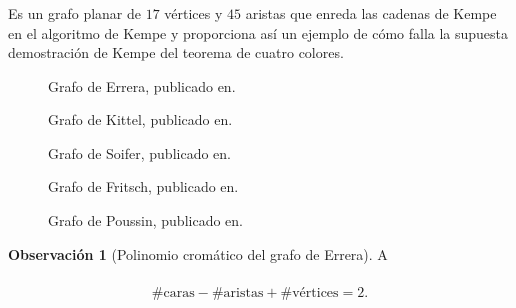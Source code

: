 \documentclass[spanish, utf8,handout]{beamer} %
\theoremstyle{definition}
\newtheorem{remark}{Observación}
\begin{document}
\begin{frame}[allowframebreaks]
\frametitle{\insertsubsection}

\begin{example}
Es un grafo planar de $17$ vértices y $45$ aristas que enreda las cadenas de Kempe en el algoritmo de Kempe y proporciona así un ejemplo de cómo falla la supuesta demostración de Kempe del teorema de cuatro colores.
\end{example}

\begin{figure}[H]
	\centering
	\scalebox{.3}{}
	\caption{Grafo de Errera, publicado en.}
\end{figure}

\begin{figure}[H]
	\centering
	\scalebox{.3}{}
	\caption{Grafo de Kittel, publicado en.}
\end{figure}

\begin{figure}[H]
	\centering
	\scalebox{0.6}{}
	\caption{Grafo de Soifer, publicado en.}
\end{figure}

\begin{figure}[H]
	\centering
	\scalebox{0.6}{}
	\caption{Grafo de Fritsch, publicado en.}
\end{figure}

\begin{figure}[H]
	\centering
	\scalebox{0.6}{}
	\caption{Grafo de Poussin, publicado en.}
\end{figure}

\begin{remark}[Polinomio cromático del grafo de Errera]
A
\end{remark}
\end{frame}

\begin{frame}\transblindsvertical
\frametitle{\insertsubsection}

\begin{theorem}
\begin{equation*}
\#\text{caras} - \#\text{aristas} + \#\text{vértices} = 2.	
\end{equation*}
\end{theorem}


\end{frame}
\end{document}
